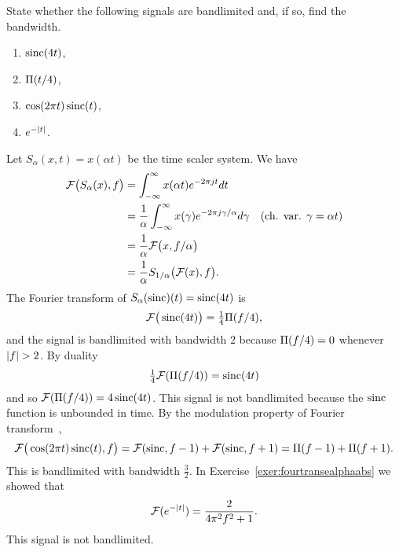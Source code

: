 \begin{excersizelist}
\item State whether the following signals are bandlimited and, if so, find the bandwidth.
\begin{enumerate}
\item $\operatorname{sinc}(4t)$,
\item $\Pi(t/4)$,
\item $\cos(2\pi t) \operatorname{sinc}(t)$,
\item $e^{-\left\vert t \right\vert}$.
\end{enumerate}
\begin{solution}
Let $S_\alpha(x,t) = x(\alpha t)$ be the time scaler system.  We have 
\begin{align*}
{\mathcal F}\big( S_\alpha(x), f\big) &= \int_{-\infty}^\infty x(\alpha t) e^{-2\pi j t } dt \\
&= \frac{1}{\alpha} \int_{-\infty}^\infty x(\gamma) e^{ -2\pi j \gamma / \alpha  } d\gamma & \text{(ch. var. $\gamma = \alpha t$)} \\
&= \frac{1}{\alpha} {\mathcal F}\big( x, f/\alpha \big) \\
&= \frac{1}{\alpha} S_{1/\alpha}\big({\mathcal F}(x),f\big).
\end{align*}
The Fourier transform of $S_\alpha(\operatorname{sinc})(t) = \operatorname{sinc}(4t)$ is
\[
{\mathcal F}\big( \operatorname{sinc}(4t) \big) = \tfrac{1}{4} \Pi(f/4),
\]
and the signal is bandlimited with bandwidth $2$ because $\Pi(f/4) = 0$ whenever $\left\vert f \right\vert > 2$.  By duality
\[
\tfrac{1}{4} {\mathcal F}(\Pi(f/4)) =  \operatorname{sinc}(4t)
\]
and so ${\mathcal F}(\Pi(f/4)) = 4 \operatorname{sinc}(4t)$.  This signal is not bandlimited because the $\operatorname{sinc}$ function is unbounded in time.  By the modulation property of Fourier transform~,
\[
{\mathcal F}\big( \cos(2\pi t) \operatorname{sinc}(t), f \big) = {\mathcal F}(\operatorname{sinc},f-1) + {\mathcal F}(\operatorname{sinc},f+1) = \Pi(f-1) + \Pi(f+1). 
\]
This is bandlimited with bandwidth $\tfrac{3}{2}$.  In Exercise~\ref{exer:fourtransealphaabs} we showed that
\[
{\mathcal F}(e^{-\left\vert t \right\vert}) =  \frac{2}{4\pi^2 f^2 + 1}.
\]
This signal is not bandlimited.
\end{solution}





\end{excersizelist}

